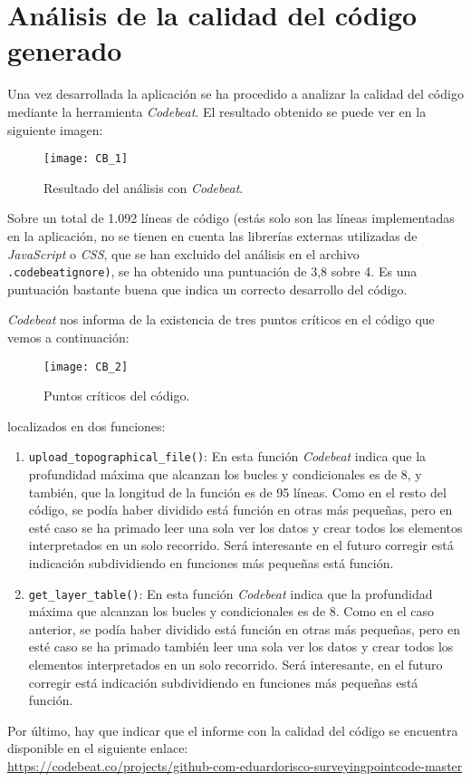 \section{Análisis de la calidad del código generado}

Una vez desarrollada la aplicación se ha procedido a analizar la calidad del código mediante la herramienta \emph{Codebeat}. El resultado obtenido se puede ver en la siguiente imagen:

\begin{figure}[!h]
	\centering
	\texttt{[image: CB\_1]}
	\caption{Resultado del análisis con \emph{Codebeat}.}
	\label{fig:CB_1}
\end{figure}

Sobre un total de 1.092 líneas de código (estás solo son las  líneas implementadas en la aplicación, no se tienen en cuenta las librerías externas utilizadas de \emph{JavaScript} o \emph{CSS}, que se han excluido del análisis en el archivo \texttt{.codebeatignore)}, se ha obtenido una puntuación de 3,8 sobre 4. Es una puntuación bastante buena que indica un correcto desarrollo del código.

\emph{Codebeat} nos informa de la existencia de tres puntos críticos en el código que vemos a continuación:

\begin{figure}[!h]
	\centering
	\texttt{[image: CB\_2]}
	\caption{Puntos críticos del código.}
	\label{fig:CB_2}
\end{figure}

localizados en dos funciones:
\begin{enumerate}

\item \texttt{upload\_topographical\_file()}: En esta función \emph{Codebeat} indica que la profundidad máxima que alcanzan los bucles y condicionales es de 8, y también, que la longitud de la función es de 95 líneas. Como en el resto del código, se podía haber dividido está función en otras más pequeñas, pero en esté caso se ha primado leer una sola ver los datos y crear todos los elementos interpretados en un solo recorrido. Será interesante en el futuro corregir está indicación subdividiendo en funciones más pequeñas está función.

\item \texttt{get\_layer\_table()}: En esta función \emph{Codebeat} indica que la profundidad máxima que alcanzan los bucles y condicionales es de 8. Como en el caso anterior, se podía haber dividido está función en otras más pequeñas, pero en esté caso se ha primado también  leer una sola ver los datos y crear todos los elementos interpretados en un solo recorrido. Será interesante, en el futuro corregir está indicación subdividiendo en funciones más pequeñas está función.
\end{enumerate}

Por último, hay que indicar que el informe con la calidad del código se encuentra disponible en el siguiente enlace:\\
 \url{https://codebeat.co/projects/github-com-eduardorisco-surveyingpointcode-master}
 